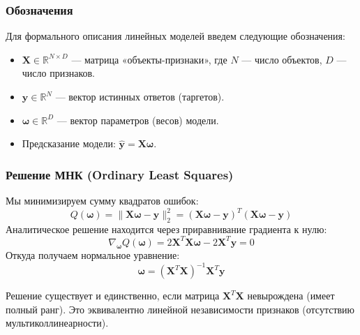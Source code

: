 \documentclass[12pt]{article}
\begin{document}
\subsubsection{Обозначения}
Для формального описания линейных моделей введем следующие обозначения:
\begin{itemize}
    \item $\mathbf{X} \in \mathbb{R}^{N \times D}$ — матрица «объекты-признаки», где $N$ — число объектов, $D$ — число признаков.
    \item $\mathbf{y} \in \mathbb{R}^N$ — вектор истинных ответов (таргетов).
    \item $\mathbf{\omega} \in \mathbb{R}^D$ — вектор параметров (весов) модели.
    \item Предсказание модели: $\mathbf{\hat{y}} = \mathbf{X}\mathbf{\omega}$.
\end{itemize}

\subsubsection{Решение МНК (Ordinary Least Squares)}
Мы минимизируем сумму квадратов ошибок:
\[ Q(\mathbf{\omega}) = \|\mathbf{X}\mathbf{\omega} - \mathbf{y}\|^2_2 = (\mathbf{X}\mathbf{\omega} - \mathbf{y})^T (\mathbf{X}\mathbf{\omega} - \mathbf{y}) \]
Аналитическое решение находится через приравнивание градиента к нулю:
\[ \nabla_{\mathbf{\omega}} Q(\mathbf{\omega}) = 2\mathbf{X}^T \mathbf{X} \mathbf{\omega} - 2\mathbf{X}^T \mathbf{y} = 0 \]
Откуда получаем нормальное уравнение:
\[ \mathbf{\omega} = (\mathbf{X}^T \mathbf{X})^{-1} \mathbf{X}^T \mathbf{y} \]

\begin{tcolorbox}[colback=theorygold!5!white,colframe=theorygold!75!black,title=Условие существования]
    Решение существует и единственно, если матрица $\mathbf{X}^T \mathbf{X}$ невырождена (имеет полный ранг). Это эквивалентно линейной независимости признаков (отсутствию мультиколлинеарности).
\end{tcolorbox}
\end{document}
